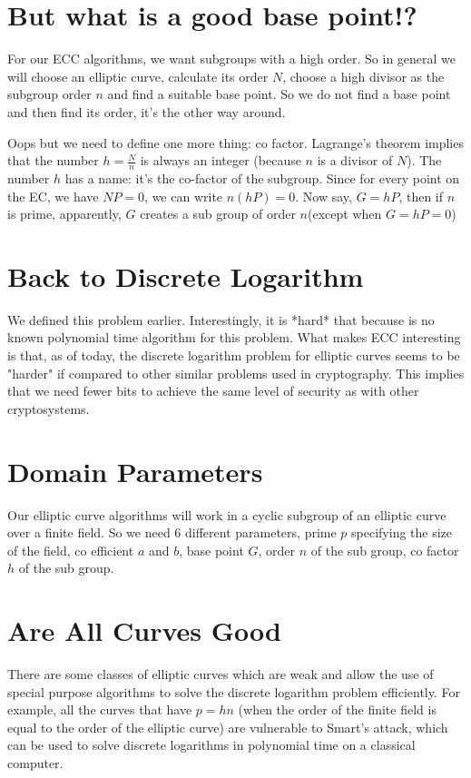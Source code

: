 \documentclass{article}
\begin{document}
\section{But what is a good base point!?}
For our ECC algorithms, we want subgroups with a high order. So in general we will choose an elliptic curve, calculate its order $N$, choose a high divisor as the subgroup order $n$ and find a suitable base point. So we do not find a base point and then find its order, it's the other way around.

Oops but we need to define one more thing: co factor. Lagrange's theorem implies that the number $h=\frac{N}{n}$ is always an integer (because $n$ is a divisor of $N$). The number $h$ has a name: it's the co-factor of the subgroup.
Since for every point on the EC, we have $NP=0$, we can write $n(hP)=0$. Now say, $G=hP$, then if $n$ is prime, apparently, $G$ creates a sub group of order $n$(except when $G=hP=0$)
\section{Back to Discrete Logarithm}
We defined this problem earlier. Interestingly, it is *hard* that because is no known polynomial time algorithm for this problem. What makes ECC interesting is that, as of today, the discrete logarithm problem for elliptic curves seems to be "harder" if compared to other similar problems used in cryptography. This implies that we need fewer bits to achieve the same level of security as with other cryptosystems.

\section{Domain Parameters}
Our elliptic curve algorithms will work in a cyclic subgroup of an elliptic curve over a finite field. So we need $6$ different parameters, prime $p$ specifying the size of the field, co efficient $a$ and $b$, base point $G$, order $n$ of the sub group, co factor $h$ of the sub group.
\section{Are All Curves Good}
There are some classes of elliptic curves which are weak and allow the use of special purpose algorithms to solve the discrete logarithm problem efficiently. For example, all the curves that have $p=hn$ (when the order of the finite field is equal to the order of the elliptic curve) are vulnerable to Smart's attack, which can be used to solve discrete logarithms in polynomial time on a classical computer.
\end{document}
